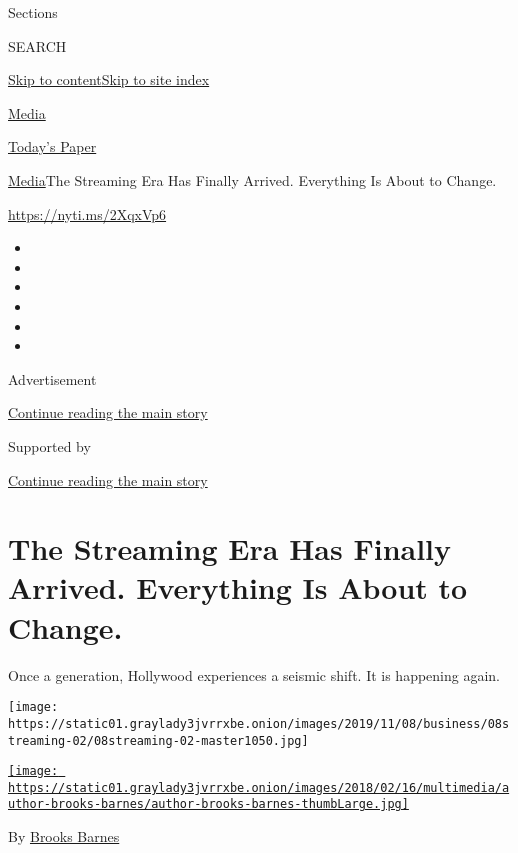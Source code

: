 Sections

SEARCH

\protect\hyperlink{site-content}{Skip to
content}\protect\hyperlink{site-index}{Skip to site index}

\href{https://www.nytimes3xbfgragh.onion/section/business/media}{Media}

\href{https://myaccount.nytimes3xbfgragh.onion/auth/login?response_type=cookie\&client_id=vi}{}

\href{https://www.nytimes3xbfgragh.onion/section/todayspaper}{Today's
Paper}

\href{/section/business/media}{Media}\textbar{}The Streaming Era Has
Finally Arrived. Everything Is About to Change.

\url{https://nyti.ms/2XqxVp6}

\begin{itemize}
\item
\item
\item
\item
\item
\item
\end{itemize}

Advertisement

\protect\hyperlink{after-top}{Continue reading the main story}

Supported by

\protect\hyperlink{after-sponsor}{Continue reading the main story}

\hypertarget{the-streaming-era-has-finally-arrived-everything-is-about-to-change}{%
\section{The Streaming Era Has Finally Arrived. Everything Is About to
Change.}\label{the-streaming-era-has-finally-arrived-everything-is-about-to-change}}

Once a generation, Hollywood experiences a seismic shift. It is
happening again.

\texttt{[image: https://static01.graylady3jvrrxbe.onion/images/2019/11/08/business/08streaming-02/08streaming-02-master1050.jpg]}

\href{https://www.nytimes3xbfgragh.onion/by/brooks-barnes}{\texttt{[image: https://static01.graylady3jvrrxbe.onion/images/2018/02/16/multimedia/author-brooks-barnes/author-brooks-barnes-thumbLarge.jpg]}}

By \href{https://www.nytimes3xbfgragh.onion/by/brooks-barnes}{Brooks
Barnes}

